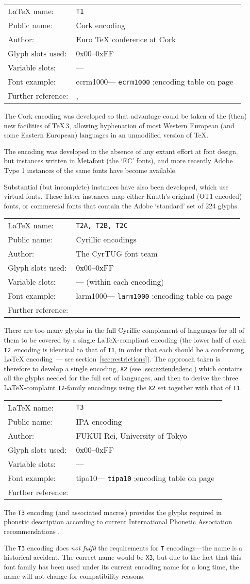 \documentclass{ltxguide}[1994/11/20]
\makeatletter
\providecommand{\Enc}[1]{\texttt{#1}}
\newenvironment{encodinginfo}[7]%
  {\noindent
   \begin{tabularx}{\linewidth}{@{}l>{\raggedright\let\\\tabularnewline}X}%
     \LaTeX{} name:          & \texttt{#1}\\%
     Public name:          & #2\\%
     Author:                   & #3\\%
     Glyph slots used: & #4\\%
     Variable slots:     & #5\\%
     Font example:     & \def\@tempa{#6}\ifx\@tempa\@empty---%
                            \else\texttt{#6}\referenceftable{#6}\fi\\%
     Further reference:                & #7%
   \end{tabularx}%
   \par\nobreak
   \vspace*{3pt}%
   \quote
  }%
  {\endquote
   \vspace{6pt}}
\def\referenceftable#1{
  \@ifundefined{r@fonttable:#1}%
  \relax
  {;\space encoding table on page~\pageref{fonttable:#1}}%
}
\makeatother
\begin{document}
\begin{encodinginfo}{T1}
        {Cork encoding}
        {Euro \TeX{} conference at Cork}
        {0x00--0xFF}
        {---}
        {ecrm1000}
        {\cite[p.514]{tub:MFe90}, \cite[p.99]{Knappen:TB17-2-96}}

  The Cork encoding was developed so that advantage could be taken of
  the (then) new facilities of \TeX{}\,3, allowing hyphenation of
  most Western European (and some Eastern European) languages in an
  unmodified version of \TeX{}.

  The encoding was developed in the absence of any extant effort at
  font design, but instances written in Metafont (the `EC' fonts), and
  more recently Adobe Type 1 instances of the same fonts have become
  available.

  Substantial (but incomplete) instances have also been developed,
  which use virtual fonts.  These latter instances map either Knuth's
  original (OT1-encoded) fonts, or commercial fonts that contain the
  Adobe `standard' set of 224 glyphs.
\end{encodinginfo}

\begin{encodinginfo}
  {T2A, T2B, T2C}
  {Cyrillic encodings}
  {The CyrTUG font team}
  {0x00--0xFF}
  {--- (within each encoding)}
  {larm1000}
  {\cite{Berdnikov:eurotex-98}}

  There are too many glyphs in the full Cyrillic complement of
  languages for all of them to be covered by a single
  \LaTeX{}-compliant encoding (the lower half of each
  \Enc{T2}~encoding is identical to that of \Enc{T1}, in order that
  each should be a conforming \LaTeX{} encoding~--- see
  section~\ref{sec:restrictions}).  The approach taken is
  therefore to develop a single encoding, \Enc{X2} (see \ref{sec:extendedenc})
  which contains all the glyphs needed for the full set of
  languages, and then to derive the three \LaTeX{}-complaint
  \Enc{T2}-family encodings using the \Enc{X2} set together with that of
  \Enc{T1}.

\end{encodinginfo}



\begin{encodinginfo}{T3}
        {IPA encoding}
        {FUKUI Rei, University of Tokyo}
        {0x00--0xFF}
        {---}
        {tipa10}
        {\cite[p.102]{Rei:TB17-2-102}}


    The \Enc{T3} encoding (and associated macros) provides the glyphs required
  in phonetic description according to current International Phonetic
  Association recommendations \cite{ipa}.

  The \Enc{T3} encoding does \emph{not fulfil} the requirements for \Enc{T}
  encodings---the name is a historical accident. The correct name would be
  \Enc{X3}, but due to the fact that this font family has been used under its
  current encoding name for a long time, the name will not change for
  compatibility reasons.

\end{encodinginfo}
\end{document}
